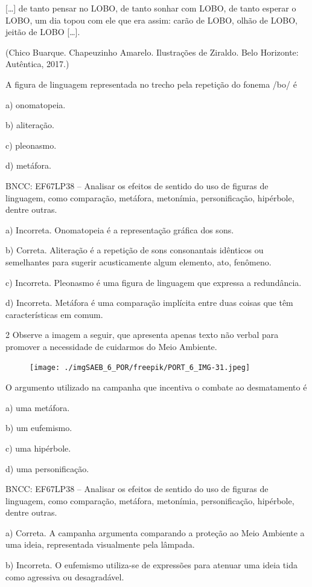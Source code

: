 {[}\ldots{]} de tanto pensar no LOBO, de tanto sonhar com LOBO, de tanto
esperar o LOBO, um dia topou com ele que era assim: carão de LOBO, olhão
de LOBO, jeitão de LOBO {[}\ldots{]}.

(Chico Buarque. Chapeuzinho Amarelo. Ilustrações de Ziraldo. Belo
Horizonte: Autêntica, 2017.)

A figura de linguagem representada no trecho pela repetição do fonema
/bo/ é

a) onomatopeia.

b) aliteração.

c) pleonasmo.

d) metáfora.

BNCC: EF67LP38 -- Analisar os efeitos de sentido do uso de figuras de
linguagem, como comparação, metáfora, metonímia, personificação,
hipérbole, dentre outras.

a) Incorreta. Onomatopeia é a representação gráfica dos sons.

b) Correta. Aliteração é a repetição de sons consonantais idênticos ou
semelhantes para sugerir acusticamente algum elemento, ato, fenômeno.

c) Incorreta. Pleonasmo é uma figura de linguagem que expressa a
redundância.

d) Incorreta. Metáfora é uma comparação implícita entre duas coisas que
têm características em comum.

\num{2} Observe a imagem a seguir, que apresenta apenas texto não verbal
para promover a necessidade de cuidarmos do Meio Ambiente.

\begin{figure}
\texttt{[image: ./imgSAEB\_6\_POR/freepik/PORT\_6\_IMG-31.jpeg]}
\end{figure}

O argumento utilizado na campanha que incentiva o combate ao
desmatamento é

a) uma metáfora.

b) um eufemismo.

c) uma hipérbole.

d) uma personificação.

BNCC: EF67LP38 -- Analisar os efeitos de sentido do uso de figuras de
linguagem, como comparação, metáfora, metonímia, personificação,
hipérbole, dentre outras.

a) Correta. A campanha argumenta comparando a proteção ao Meio Ambiente
a uma ideia, representada visualmente pela lâmpada.

b) Incorreta. O eufemismo utiliza-se de expressões para atenuar uma
ideia tida como agressiva ou desagradável.

